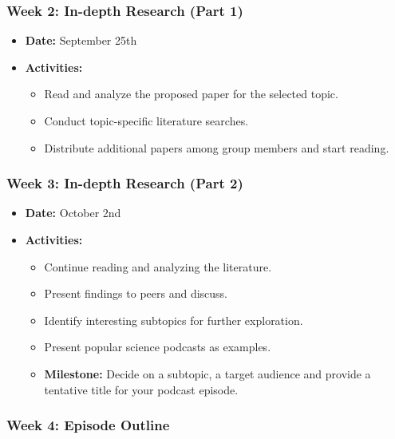 \documentclass[
  letterpaper,
  DIV=11,
  numbers=noendperiod]{scrreprt}
\providecommand{\tightlist}{%
  \setlength{\itemsep}{0pt}\setlength{\parskip}{0pt}}\usepackage{longtable,booktabs,array}
\begin{document}
\begin{tcolorbox}
\subsubsection{Week 2: In-depth Research (Part
1)}\label{week-2-in-depth-research-part-1}

\begin{itemize}
\tightlist
\item
  \textbf{Date:} September 25th
\item
  \textbf{Activities:}

  \begin{itemize}
  \tightlist
  \item
    Read and analyze the proposed paper for the selected topic.
  \item
    Conduct topic-specific literature searches.
  \item
    Distribute additional papers among group members and start reading.
  \end{itemize}
\end{itemize}

\subsubsection{Week 3: In-depth Research (Part
2)}\label{week-3-in-depth-research-part-2}

\begin{itemize}
\tightlist
\item
  \textbf{Date:} October 2nd
\item
  \textbf{Activities:}

  \begin{itemize}
  \tightlist
  \item
    Continue reading and analyzing the literature.
  \item
    Present findings to peers and discuss.
  \item
    Identify interesting subtopics for further exploration.
  \item
    Present popular science podcasts as examples.
  \item
    \textbf{Milestone:} Decide on a subtopic, a target audience and
    provide a tentative title for your podcast episode.
  \end{itemize}
\end{itemize}

\subsubsection{Week 4: Episode Outline}\label{week-4-episode-outline}


\end{tcolorbox}
\end{document}
